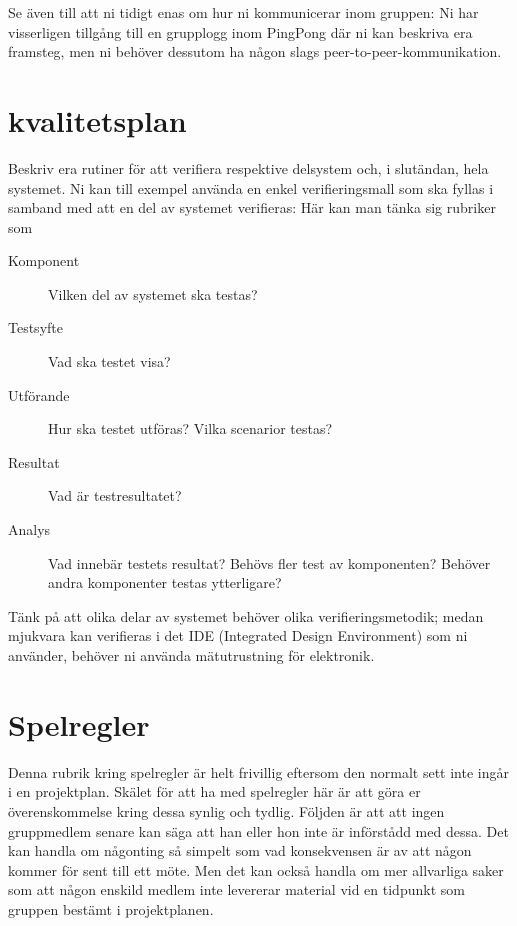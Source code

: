 \documentclass[a4paper]{article}
\begin{document}
Se även till att ni tidigt enas om hur ni kommunicerar inom gruppen:
Ni har visserligen tillgång till en grupplogg inom PingPong där ni kan
beskriva era framsteg, men ni behöver dessutom ha någon slags
peer-to-peer-kommunikation.



\section {kvalitetsplan}


Beskriv era rutiner för att verifiera respektive delsystem och, i
slutändan, hela systemet. Ni kan till exempel använda en enkel
verifieringsmall som ska fyllas i samband med att en del av systemet
verifieras: Här kan man tänka sig rubriker som

\begin {description}
\item [Komponent] Vilken del av systemet ska testas?

\item [Testsyfte] Vad ska testet visa?

\item [Utförande] Hur ska testet utföras? Vilka scenarior testas?

\item [Resultat] Vad är testresultatet?

\item [Analys]Vad innebär testets resultat? Behövs fler test av komponenten? Behöver andra komponenter testas ytterligare?

    
\end{description}


Tänk på att olika delar av systemet behöver olika verifieringsmetodik;
medan mjukvara kan verifieras i det IDE (Integrated Design Environment)
som ni använder, behöver ni använda mätutrustning för elektronik.



\section {Spelregler}


Denna rubrik kring spelregler är helt frivillig eftersom den normalt
sett inte ingår i en projektplan. Skälet för att ha med spelregler här
är att göra er överenskommelse kring dessa synlig och tydlig. Följden är
att att ingen gruppmedlem senare kan säga att han eller hon inte är
införstådd med dessa. Det kan handla om någonting så simpelt som vad
konsekvensen är av att någon kommer för sent till ett möte. Men det kan
också handla om mer allvarliga saker som att någon enskild medlem inte
levererar material vid en tidpunkt som gruppen bestämt i projektplanen.



\end{document}
